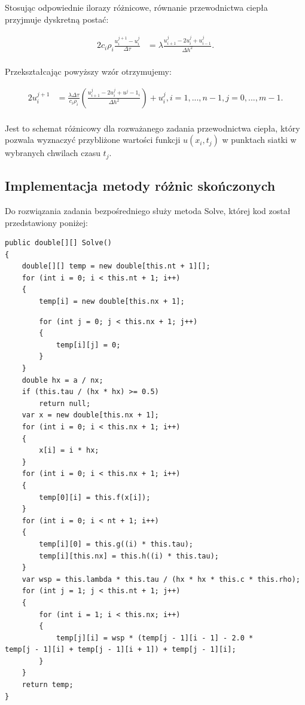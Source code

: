 \documentclass[twoside]{projektInzynierskiMS1}
\newcommand{\si}{ś}
\begin{document}
Stosując odpowiednie ilorazy różnicowe, równanie przewodnictwa ciepła przyjmuje dyskretną postać:

\begin{alignat*}{2}
c_i \rho _i \frac{ u^{j+1}_i - u^j_i}{ \Delta \tau}&= \lambda \frac{ u^j_{i+1} - 2u^j_i+u^j_{i-1}}{\Delta h^2}.\\
\end{alignat*}

Przekształcając powyższy wzór otrzymujemy:

\begin{alignat*}{2}
 u^{j+1}_i&= \frac{\lambda \Delta \tau}{c_i \rho _i} \left( \frac{u^j_{i+1} - 2u^j_i+u^j-1_i}{\Delta h^2} \right) + u^j_i, i=1, ..., n-1, j =0, ..., m-1.\\
\end{alignat*}

Jest to schemat różnicowy dla rozważanego zadania przewodnictwa ciepła, który pozwala wyznaczyć przybliżone warto\si ci funkcji $u(x_i, t_j)$ w punktach siatki w wybranych chwilach czasu $t_j$.

\subsection{Implementacja metody różnic skończonych}

Do rozwiązania zadania bezpośredniego służy metoda Solve, której kod został przedstawiony poniżej:
\begin{verbatim}
public double[][] Solve()
{
    double[][] temp = new double[this.nt + 1][];
    for (int i = 0; i < this.nt + 1; i++)
    {
        temp[i] = new double[this.nx + 1];
\end{verbatim} \newpage
\begin{verbatim}
        for (int j = 0; j < this.nx + 1; j++)
        {
            temp[i][j] = 0;
        }
    }
    double hx = a / nx;
    if (this.tau / (hx * hx) >= 0.5)
        return null;
    var x = new double[this.nx + 1];
    for (int i = 0; i < this.nx + 1; i++)
    {
        x[i] = i * hx;
    }
    for (int i = 0; i < this.nx + 1; i++)
    {
        temp[0][i] = this.f(x[i]);
    }
    for (int i = 0; i < nt + 1; i++)
    {
        temp[i][0] = this.g((i) * this.tau);
        temp[i][this.nx] = this.h((i) * this.tau);
    }
    var wsp = this.lambda * this.tau / (hx * hx * this.c * this.rho);
    for (int j = 1; j < this.nt + 1; j++)
    {
        for (int i = 1; i < this.nx; i++)
        {
            temp[j][i] = wsp * (temp[j - 1][i - 1] - 2.0 * 
temp[j - 1][i] + temp[j - 1][i + 1]) + temp[j - 1][i];
        }
    }
    return temp;
}   
\end{verbatim}
\end{document}
